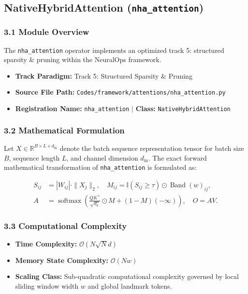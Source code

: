 \subsection{NativeHybridAttention (\texttt{nha\_attention})}
\label{sec:app_module_nha_attention}

\subsubsection*{3.1 Module Overview}
The \texttt{nha\_attention} operator implements an optimized track 5: structured sparsity \& pruning within the NeuralOps framework.
\begin{itemize}
    \item \textbf{Track Paradigm:} Track 5: Structured Sparsity \& Pruning
    \item \textbf{Source File Path:} \texttt{Codes/framework/attentions/nha\_attention.py}
    \item \textbf{Registration Name:} \texttt{nha\_attention} $\mid$ \textbf{Class:} \texttt{NativeHybridAttention}
\end{itemize}

\subsubsection*{3.2 Mathematical Formulation}
Let $X \in \mathbb{R}^{B \times L \times d_{\text{in}}}$ denote the batch sequence representation tensor for batch size $B$, sequence length $L$, and channel dimension $d_{\text{in}}$. The exact forward mathematical transformation of \texttt{nha\_attention} is formulated as:

\begin{align}
S_{ij} &= |W_{ij}| \cdot \|X_j\|_2, \quad M_{ij} = \mathbb{I}(S_{ij} \ge \tau) \odot \operatorname{Band}(w)_{ij}, \\
A &= \operatorname{softmax}\left(\frac{Q K^\top}{\sqrt{d_k}} \odot M + (1 - M)(-\infty)\right), \quad O = A V.
\end{align}


\subsubsection*{3.3 Computational Complexity}
\begin{itemize}
    \item \textbf{Time Complexity:} $\mathcal{O}(N \sqrt{N} d)$
    \item \textbf{Memory State Complexity:} $\mathcal{O}(N w)$
    \item \textbf{Scaling Class:} Sub-quadratic computational complexity governed by local sliding window width $w$ and global landmark tokens.
\end{itemize}

